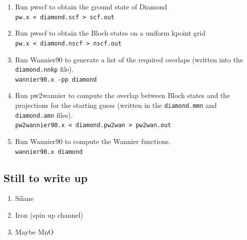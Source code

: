 \documentclass[a4paper,11pt,twoside]{article}
\begin{document}
\begin{enumerate}
\item Run pwscf to obtain the ground state of Diamond\\
{\tt pw.x < diamond.scf > scf.out}

\item Run pwscf to obtain the Bloch states on a uniform kpoint grid\\
{\tt pw.x < diamond.nscf > nscf.out}

\item Run Wannier90 to generate a list of the required overlaps (written
  into the {\tt diamond.nnkp} file).\\ 
{\tt wannier90.x -pp diamond}

\item Run pw2wannier to compute the overlap between Bloch states and the
  projections for the starting guess (written in the {\tt diamond.mmn} and {\tt diamond.amn} files).\\ 
{\tt pw2wannier90.x < diamond.pw2wan > pw2wan.out}

\item Run Wannier90 to compute the Wannier functions.\\
{\tt wannier90.x diamond}

\end{enumerate}

\subsection{Still to write up}

\begin{enumerate}

\item Silane

\item Iron (spin up channel)

\item Maybe MnO

\end{enumerate}
\end{document}
